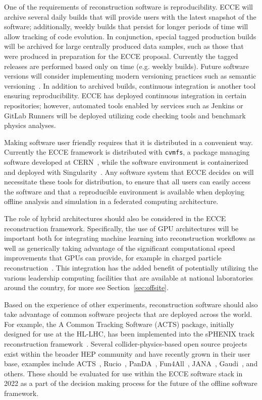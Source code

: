 One of the requirements of reconstruction software is reproducibility. ECCE will archive several daily builds that will provide users with the latest snapshot of the software; additionally, weekly builds that persist for longer periods of time will allow tracking of code evolution. In conjunction, special tagged production builds will be archived for large centrally produced data samples, such as those that were produced in preparation for the ECCE proposal. Currently the tagged releases are performed based only on time (e.g. weekly builds). Future software versions will consider implementing modern versioning practices such as semantic versioning~\cite{semantic}. In addition to archived builds, continuous integration is another tool ensuring reproducibility. ECCE has deployed continuous integration in certain repositories; however, automated tools enabled by services such as Jenkins or GitLab Runners will be deployed utilizing code checking tools and benchmark physics analyses. 

Making software user friendly requires that it is distributed in a convenient way. Currently the ECCE framework is distributed with \texttt{cvmfs}, a package managing software developed at CERN~\cite{cernvm}, while the software environment is containerized and deployed with Singularity~\cite{singularity}. Any software system that ECCE decides on will necessitate these tools for distribution, to ensure that all users can easily access the software and that a reproducible environment is available when deploying offline analysis and simulation in a federated computing architecture.

The role of hybrid architectures should also be considered in the ECCE reconstruction framework. Specifically, the use of GPU architectures will be important both for integrating machine learning into reconstruction workflows as well as generically taking advantage of the significant computational speed improvements that GPUs can provide, for example in charged particle reconstruction~\cite{Ai:2021kzk}. This integration has the added benefit of potentially utilizing the various leadership computing facilities that are available at national laboratories around the country, for more see Section~\ref{sec:offsite}.


Based on the experience of other experiments, reconstruction software should also take advantage of common software projects that are deployed across the world. For example, the A Common Tracking Software (ACTS) package, initially designed for use at the HL-LHC, has been implemented into the sPHENIX track reconstruction framework~\cite{Osborn:2021zlr}. Several collider-physics-based open source projects exist within the broader HEP community and have recently grown in their user base, examples include ACTS~\cite{Ai:2021ghi}, Rucio~\cite{Barisits:2019fyl}, PanDA~\cite{pandaDocs}, Fun4All~\cite{fun4allGithub}, JANA~\cite{jana2_chep19}, Gaudi~\cite{Gaudi}, and others. These should be evaluated for use within the ECCE software stack in 2022 as a part of the decision making process for the future of the offline software framework.



